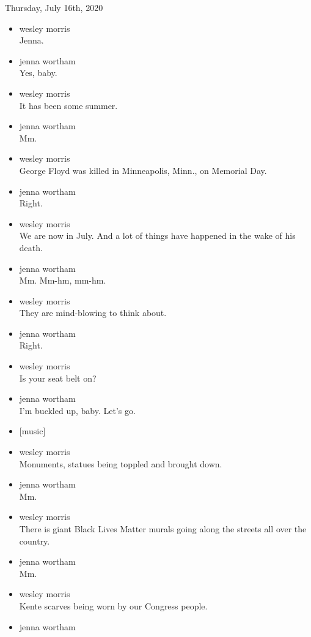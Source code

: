 Thursday, July 16th, 2020

\begin{itemize}
\item
  wesley morris\\
  Jenna.
\item
  jenna wortham\\
  Yes, baby.
\item
  wesley morris\\
  It has been some summer.
\item
  jenna wortham\\
  Mm.
\item
  wesley morris\\
  George Floyd was killed in Minneapolis, Minn., on Memorial Day.
\item
  jenna wortham\\
  Right.
\item
  wesley morris\\
  We are now in July. And a lot of things have happened in the wake of
  his death.
\item
  jenna wortham\\
  Mm. Mm-hm, mm-hm.
\item
  wesley morris\\
  They are mind-blowing to think about.
\item
  jenna wortham\\
  Right.
\item
  wesley morris\\
  Is your seat belt on?
\item
  jenna wortham\\
  I'm buckled up, baby. Let's go.
\item
  {[}music{]}
\item
  wesley morris\\
  Monuments, statues being toppled and brought down.
\item
  jenna wortham\\
  Mm.
\item
  wesley morris\\
  There is giant Black Lives Matter murals going along the streets all
  over the country.
\item
  jenna wortham\\
  Mm.
\item
  wesley morris\\
  Kente scarves being worn by our Congress people.
\item
  jenna wortham\\

\end{itemize}
